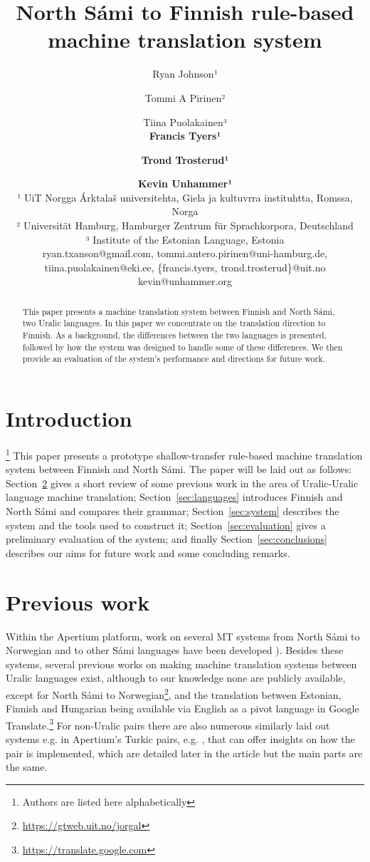 \documentclass[11pt]{article}
\title{North Sámi to Finnish rule-based machine translation system}
\author{Ryan Johnson¹ \and Tommi A Pirinen² \and Tiina Puolakainen³ \\ \textbf{Francis Tyers¹} \and \textbf{Trond Trosterud¹} \and \textbf{Kevin Unhammer¹}\\ 
¹ UiT Norgga \'Arktala\v{s} universitehta, Giela ja kultuvrra instituhtta, Romssa, Norga \\
² Universit\"{a}t Hamburg, Hamburger Zentrum f\"{u}r Sprachkorpora, Deutschland \\
³ Institute of the Estonian Language, Estonia\\
ryan.txanson@gmail.com, tommi.antero.pirinen@uni-hamburg.de, \\ tiina.puolakainen@eki.ee,
\{francis.tyers, trond.trosterud\}@uit.no \\
kevin@unhammer.org
}
\date{}
\begin{document}
\maketitle
\begin{abstract}
This paper presents a machine translation system between Finnish and North Sámi, two Uralic languages.
In this paper we concentrate on the translation direction to Finnish.
%
As a background, the differences between the two languages is presented, followed by how the system was designed to handle some of these differences.
We then provide an evaluation of the system's performance and directions for future work.
\end{abstract}

% 
%

\section{Introduction}
\label{sec:introduction}
\footnote[0]{Authors are listed here alphabetically}
This paper presents a prototype shallow-transfer rule-based machine translation system between Finnish and North Sámi.
The paper will be laid out as follows: Section\ \ref{sec:previous-work} gives a short review of some previous work in the area of Uralic-Uralic language machine translation; Section\ \ref{sec:languages} introduces Finnish and North Sámi and compares their grammar; Section\ \ref{sec:system} describes the system and the tools used to construct it; Section\ \ref{sec:evaluation} gives a preliminary evaluation of the system; and finally Section\ \ref{sec:conclusions} describes our aims for future work and some concluding remarks.

\section{Previous work}
\label{sec:previous-work}

Within the Apertium platform, work on several MT systems from North Sámi to Norwegian and to other Sámi languages have been developed \cite{tyers09,wiechetek10,trosterud12,smesma}).
Besides these systems, several previous works on making machine translation systems between Uralic languages exist, although to our knowledge none are publicly available, except for North Sámi to Norwegian\footnote{\url{https://gtweb.uit.no/jorgal}}, and the translation between Estonian, Finnish and Hungarian being available via English as a pivot language in Google Translate.\footnote{\url{https://translate.google.com}}
For non-Uralic pairs there are also numerous similarly laid out systems e.g. in Apertium's Turkic pairs, e.g. \cite{salimzyanov2013free}, that can offer insights on how the pair is implemented, which are detailed later in the article but the main parts are the same. 
\end{document}
